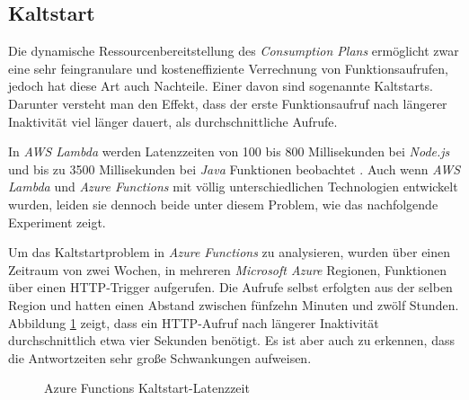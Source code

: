 \subsection{Kaltstart}
\label{subsec:coldstart}

Die dynamische Ressourcenbereitstellung des \textit{Consumption Plans} ermöglicht zwar eine sehr feingranulare und kosteneffiziente Verrechnung von Funktionsaufrufen, jedoch hat diese Art auch Nachteile. Einer davon sind sogenannte Kaltstarts. Darunter versteht man den Effekt, dass der erste Funktionsaufruf nach längerer Inaktivität viel länger dauert, als durchschnittliche Aufrufe.

In \textit{AWS Lambda} werden Latenzzeiten von 100 bis 800 Millisekunden bei \textit{Node.js} und bis zu 3500 Millisekunden bei \textit{Java} Funktionen beobachtet \cite[Kap. 16]{Fuller2016}. Auch wenn \textit{AWS Lambda} und \textit{Azure Functions} mit völlig unterschiedlichen Technologien entwickelt wurden, leiden sie dennoch beide unter diesem Problem, wie das nachfolgende Experiment zeigt.

Um das Kaltstartproblem in \textit{Azure Functions} zu analysieren, wurden über einen Zeitraum von zwei Wochen, in mehreren \textit{Microsoft Azure} Regionen, Funktionen über einen HTTP-Trigger aufgerufen. Die Aufrufe selbst erfolgten aus der selben Region und hatten einen Abstand zwischen fünfzehn Minuten und zwölf Stunden. Abbildung \ref{fig:azfun-latency} zeigt, dass ein HTTP-Aufruf nach längerer Inaktivität durchschnittlich etwa vier Sekunden benötigt. Es ist aber auch zu erkennen, dass die Antwortzeiten sehr große Schwankungen aufweisen.

\begin{figure}[!hbt]%
\caption{Azure Functions Kaltstart-Latenzzeit}%
\label{fig:azfun-latency}%
\centering
{}

\end{figure}

